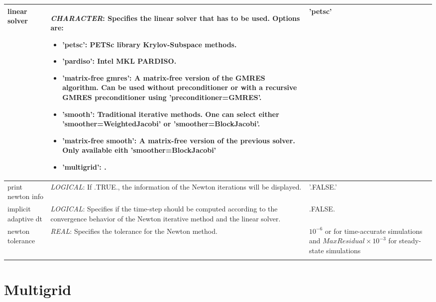 \documentclass[a4paper,10pt]{report}
\begin{document}
\begin{longtable}{|p{4cm}|p{10cm}|p{2.2cm}|}
linear solver           & \textit{CHARACTER}: Specifies the linear solver that has to be used. Options are:\ 
				\begin{itemize}
					\item 'petsc': PETSc library Krylov-Subspace methods.
					\item 'pardiso': Intel MKL PARDISO.
					\item 'matrix-free gmres': A matrix-free version of the GMRES algorithm. Can be used without preconditioner or with a recursive GMRES preconditioner using 'preconditioner=GMRES'.
					\item 'smooth': Traditional iterative methods. One can select either 'smoother=WeightedJacobi' or 'smoother=BlockJacobi'.
					\item 'matrix-free smooth': A matrix-free version of the previous solver. Only available eith 'smoother=BlockJacobi'
					\item 'multigrid': .
				\end{itemize}
										& 'petsc'  \\ \hline
print newton info       & \textit{LOGICAL}: If .TRUE., the information of the Newton iterations will be displayed. &  '.FALSE.'\\ \hline
implicit adaptive dt  & \textit{LOGICAL}: Specifies if the time-step should be computed according to the convergence behavior of the Newton iterative method and the linear solver. & .FALSE. \\ \hline
newton tolerance   & \textit{REAL}: Specifies the tolerance for the Newton method. &  $10^{-6}$ or for time-accurate simulations and  $MaxResidual \times 10^{-3}$ for steady-state simulations \\ \hline
    &  &  \\ \hline
    
\end{longtable}

\section{Multigrid}
\end{document}
